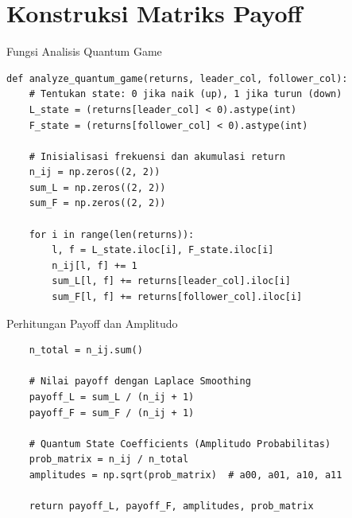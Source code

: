 \documentclass[aspectratio=169]{beamer}
\begin{document}
\section{Konstruksi Matriks Payoff}

\begin{frame}[fragile]{Fungsi Analisis Quantum Game}
\begin{lstlisting}
def analyze_quantum_game(returns, leader_col, follower_col):
    # Tentukan state: 0 jika naik (up), 1 jika turun (down)
    L_state = (returns[leader_col] < 0).astype(int)
    F_state = (returns[follower_col] < 0).astype(int)
    
    # Inisialisasi frekuensi dan akumulasi return
    n_ij = np.zeros((2, 2))
    sum_L = np.zeros((2, 2))
    sum_F = np.zeros((2, 2))
    
    for i in range(len(returns)):
        l, f = L_state.iloc[i], F_state.iloc[i]
        n_ij[l, f] += 1
        sum_L[l, f] += returns[leader_col].iloc[i]
        sum_F[l, f] += returns[follower_col].iloc[i]
\end{lstlisting}
\end{frame}

\begin{frame}[fragile]{Perhitungan Payoff dan Amplitudo}
\begin{lstlisting}
    n_total = n_ij.sum()
    
    # Nilai payoff dengan Laplace Smoothing
    payoff_L = sum_L / (n_ij + 1)
    payoff_F = sum_F / (n_ij + 1)
    
    # Quantum State Coefficients (Amplitudo Probabilitas)
    prob_matrix = n_ij / n_total
    amplitudes = np.sqrt(prob_matrix)  # a00, a01, a10, a11
    
    return payoff_L, payoff_F, amplitudes, prob_matrix
\end{lstlisting}
\end{frame}
\end{document}
